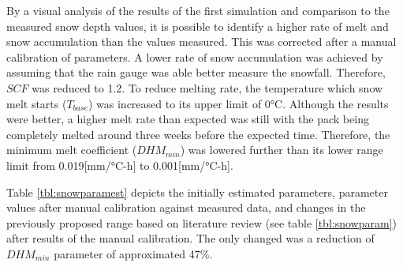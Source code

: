 By a visual analysis of the results of the first simulation and comparison to the measured snow depth values, it is possible to identify a higher rate of melt and snow accumulation than the values measured. This was corrected after a manual calibration of parameters. A lower rate of snow accumulation was achieved by assuming that the rain gauge was able better measure the snowfall. Therefore, $SCF$ was reduced to 1.2. To reduce melting rate, the temperature which snow melt starts ($T_{base}$) was increased to its upper limit of 0°C. Although the results were better, a higher melt rate than expected was still with the pack being completely melted around three weeks before the expected time. Therefore, the minimum melt coefficient ($DHM_{min}$) was lowered further than its lower range limit from 0.019[mm/°C-h] to 0.001[mm/°C-h].


Table \ref{tbl:snowparamest} depicts the initially estimated parameters, parameter values after manual calibration against measured data, and changes in the previously proposed range based on literature review (see table \ref{tbl:snowparam}) after results of the manual calibration. The only changed was a reduction of $DHM_{min}$ parameter of approximated 47\%. 

